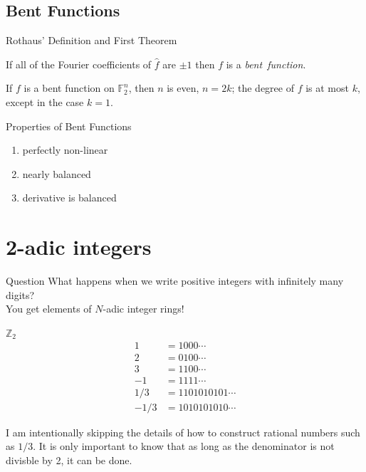 \documentclass{beamer}
\def\zzz{\mathbb{Z}}
\def\gftwo{\mathbb{F}_2}
\begin{document}
\subsection{Bent Functions}
\begin{frame}{Rothaus' Definition and First Theorem}
  \begin{definition}\label{def:bent-function}
    If all of the Fourier coefficients of $\hat{f}$ are $\pm1$ then
    $f$ is a {\em bent\ function}.
  \end{definition}
  \begin{theorem}\label{thm:deg-of-bent-function}
  	If $f$ is a bent function on $\gftwo^n$, then $n$ is even, $n=2k$;
  	the degree of $f$ is at most $k$, except in the case $k=1$.
  \end{theorem}
\end{frame}

\begin{frame}{Properties of Bent Functions}
  \begin{enumerate}[1.]
    \item perfectly non-linear
    \item nearly balanced
    \item derivative is balanced
  \end{enumerate}
\end{frame}

\section{2-adic integers}
\begin{frame}{Question}
  What happens when we write positive integers with infinitely many digits? \\
  \pause
  You get elements of $N$-adic integer rings!
\end{frame}

\begin{frame}{$\zzz_2$}
  \begin{align*}
    1&=1000\cdots\\
    2&=0100\cdots\\
    3&=1100\cdots\\
    -1&=1111\cdots\\
    1/3&=1101010101\cdots\\
    -1/3&=1010101010\cdots
  \end{align*}
  \par I am intentionally skipping the details of how to construct rational
  numbers such as $1/3$. It is only important to know that as long as the
  denominator is not divisble by 2, it can be done.
\end{frame}
\end{document}
